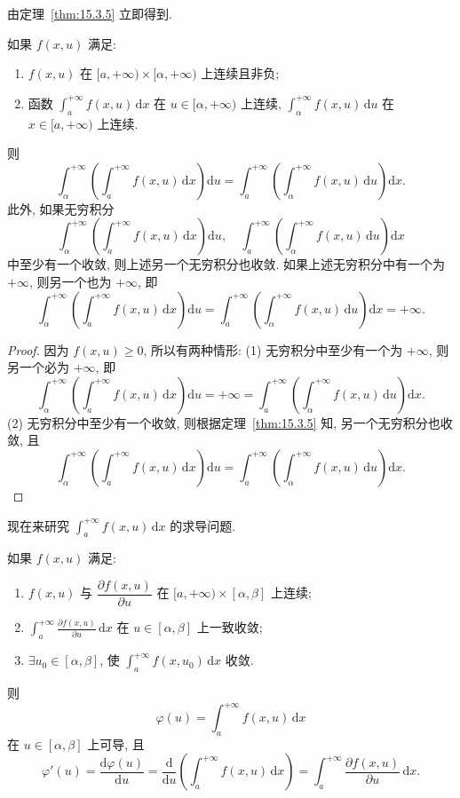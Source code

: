 由定理~\ref{thm:15.3.5} 立即得到.

\begin{corollary}[非负函数的无穷积分与无穷积分可交换]\label{cor:15.3.1}
如果 $f(x,u)$ 满足:
\begin{enumerate}
  \item $f(x,u)$ 在 $[a,+\infty)\times[\alpha,+\infty)$ 上连续且非负;
  \item 函数 $\displaystyle\int_{a}^{+\infty}f(x,u)\,\mathrm{d}x$ 在 $u\in[\alpha,+\infty)$ 上连续, $\displaystyle\int_{\alpha}^{+\infty}f(x,u)\,\mathrm{d}u$ 在 $x\in[a,+\infty)$ 上连续.
\end{enumerate}
则
\[
  \int_{\alpha}^{+\infty}\left(\int_{a}^{+\infty}f(x,u)\,\mathrm{d}x\right)\mathrm{d}u=\int_{a}^{+\infty}\left(\int_{\alpha}^{+\infty}f(x,u)\,\mathrm{d}u\right)\mathrm{d}x.
\]
此外, 如果无穷积分
\[
  \int_{\alpha}^{+\infty}\left(\int_{a}^{+\infty}f(x,u)\,\mathrm{d}x\right)\mathrm{d}u,\quad\int_{a}^{+\infty}\left(\int_{\alpha}^{+\infty}f(x,u)\,\mathrm{d}u\right)\mathrm{d}x
\]
中至少有一个收敛, 则上述另一个无穷积分也收敛.
如果上述无穷积分中有一个为 $+\infty$, 则另一个也为 $+\infty$, 即
\[
  \int_{\alpha}^{+\infty}\left(\int_{a}^{+\infty}f(x,u)\,\mathrm{d}x\right)\mathrm{d}u=\int_{a}^{+\infty}\left(\int_{\alpha}^{+\infty}f(x,u)\,\mathrm{d}u\right)\mathrm{d}x=+\infty.
\]
\end{corollary}

\begin{proof}
因为 $f(x,u)\geqslant0$, 所以有两种情形:
(1) 无穷积分中至少有一个为 $+\infty$, 则另一个必为 $+\infty$, 即
\[
  \int_{\alpha}^{+\infty}\left(\int_{a}^{+\infty}f(x,u)\,\mathrm{d}x\right)\mathrm{d}u=+\infty=\int_{a}^{+\infty}\left(\int_{\alpha}^{+\infty}f(x,u)\,\mathrm{d}u\right)\mathrm{d}x.
\]
(2) 无穷积分中至少有一个收敛, 则根据定理~\ref{thm:15.3.5} 知, 另一个无穷积分也收敛, 且
\[
  \int_{\alpha}^{+\infty}\left(\int_{a}^{+\infty}f(x,u)\,\mathrm{d}x\right)\mathrm{d}u=\int_{a}^{+\infty}\left(\int_{\alpha}^{+\infty}f(x,u)\,\mathrm{d}u\right)\mathrm{d}x.
\]
\end{proof}

现在来研究 $\displaystyle\int_{a}^{+\infty}f(x,u)\,\mathrm{d}x$ 的求导问题.

\begin{theorem}[无穷积分对参变量求导]\label{thm:15.3.6}
如果 $f(x,u)$ 满足:
\begin{enumerate}
  \item $f(x,u)$ 与 $\dfrac{\partial f(x,u)}{\partial u}$ 在 $[a,+\infty)\times[\alpha,\beta]$ 上连续;
  \item $\displaystyle\int_{a}^{+\infty}\frac{\partial f(x,u)}{\partial u}\,\mathrm{d}x$ 在 $u\in[\alpha,\beta]$ 上一致收敛;
  \item $\exists u_{0}\in[\alpha,\beta]$, 使 $\displaystyle\int_{a}^{+\infty}f(x,u_{0})\,\mathrm{d}x$ 收敛.
\end{enumerate}
则
\[
  \varphi(u)=\int_{a}^{+\infty}f(x,u)\,\mathrm{d}x
\]
在 $u\in[\alpha,\beta]$ 上可导, 且
\[
  \varphi'(u)=\frac{\mathrm{d}\varphi(u)}{\mathrm{d}u}=\frac{\mathrm{d}}{\mathrm{d}u}\left(\int_{a}^{+\infty}f(x,u)\,\mathrm{d}x\right)=\int_{a}^{+\infty}\frac{\partial f(x,u)}{\partial u}\,\mathrm{d}x.
\]
\end{theorem}

